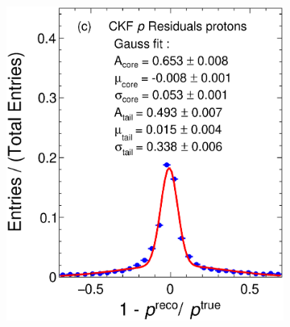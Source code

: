 \begin{figure}[t]
\begin{subfigure}{0.32\textwidth}
         \caption{}
         \label{fig:pResCKF211_Int}
     \end{subfigure}
    \begin{subfigure}{0.32\textwidth}
         \centering
         \includegraphics[width=\textwidth]{figures/ch5-KF_NDGAr/FullSample/Int/pRes/1D/Resp2212.eps}
         \caption{}
         \label{fig:pResCKF2212_Int}
     \end{subfigure}
          \begin{subfigure}{0.32\textwidth}
         \centering

\end{subfigure}
\end{figure}
